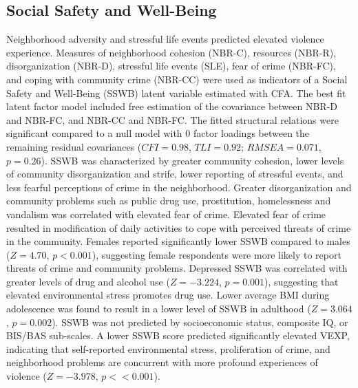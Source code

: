 \documentclass[utf8]{article}
\begin{document}
\subsection{Social Safety and Well-Being} Neighborhood adversity and stressful life events predicted elevated violence experience. Measures of neighborhood cohesion (NBR-C), resources (NBR-R), disorganization (NBR-D), stressful life events (SLE), fear of crime (NBR-FC), and coping with community crime (NBR-CC) were used as indicators of a Social Safety and Well-Being (SSWB) latent variable estimated with CFA. The best fit latent factor model included free estimation of the covariance between NBR-D and NBR-FC, and NBR-CC and NBR-FC. The fitted structural relations were significant compared to a null model with $0$ factor loadings between the remaining residual covariances ($CFI=0.98$, $TLI=0.92$; $RMSEA=0.071$, $p=0.26$). SSWB was characterized by greater community cohesion, lower levels of community disorganization and strife, lower reporting of stressful events, and less fearful perceptions of crime in the neighborhood. Greater disorganization and community problems such as public drug use, prostitution, homelessness and vandalism was correlated with elevated fear of crime. Elevated fear of crime resulted in modification of daily activities to cope with perceived threats of crime in the community. Females reported significantly lower SSWB compared to males ($Z=4.70$, $p<0.001$), suggesting female respondents were more likely to report threats of crime and community problems. Depressed SSWB was correlated with greater levels of drug and alcohol use ($Z=-3.224$, $p=0.001$), suggesting that elevated environmental stress promotes drug use. Lower average BMI during adolescence was found to result in a lower level of SSWB in adulthood ($Z=3.064$, $p=0.002$). SSWB was not predicted by socioeconomic status, composite IQ, or BIS/BAS sub-scales. A lower SSWB score predicted significantly elevated VEXP, indicating that self-reported environmental stress, proliferation of crime, and neighborhood problems are concurrent with more profound experiences of violence ($Z=-3.978$, $p<<0.001$). 
\end{document}
